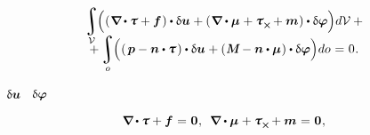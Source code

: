 \nopagebreak\vspace{-0.33em}
\begin{multline*}\label{virtualworkprinciple.2:micropolarcontinuum}
\integral\displaylimits_{\mathcal{V}} \hspace{-0.64ex} \left(^{\mathstrut} ( \hspace{.12ex} \boldnabla \hspace{-0.1ex} \dotp \forcestresstensor + \bm{f} \hspace{.12ex} ) \dotp \variation{\fieldofdisplacements} \hspace{.1ex}
+ ( \hspace{.12ex} \boldnabla \dotp \couplestresstensor \hspace{.1ex} + \forcestresstensor_{\Xcompanion} \hspace{-0.1ex} + \bm{m} \hspace{.1ex} ) \dotp \variation{\fieldofrotations} \right) \hspace{-0.32ex} d\mathcal{V} \hspace{0.5ex} + \\[-1.1em]
%
+ \integral\displaylimits_o \hspace{-0.64ex} \left(^{\mathstrut} ( \hspace{.32ex} \bm{p} - \bm{n} \dotp \forcestresstensor \hspace{.2ex} ) \dotp \variation{\fieldofdisplacements} \hspace{.1ex}
+ ( \hspace{.1ex} \mathboldM - \bm{n} \dotp \couplestresstensor \hspace{.1ex} ) \dotp \variation{\fieldofrotations} \right) \hspace{-0.32ex} do \hspace{.12ex} = \hspace{.1ex} 0 \hspace{.1ex}.
\end{multline*}

~$\updelta\hspace{-0.1ex}\bm{u}$
~$\updelta\hspace{-0.1ex}\bm{\varphi}$
~

\nopagebreak\vspace{-0.15em}\begin{equation}\label{micropolar.equilibrium:cauchy-like}
\boldnabla \hspace{-0.1ex} \dotp \forcestresstensor + \bm{f} \hspace{.12ex} = \hspace{.1ex} \zerovector
\hspace{.1ex} ,
\:\;
\boldnabla \dotp \couplestresstensor \hspace{.1ex} + \forcestresstensor_{\Xcompanion} \hspace{-0.1ex} + \bm{m} \hspace{.1ex} = \hspace{.1ex} \zerovector
\hspace{.1ex} ,
\end{equation}

